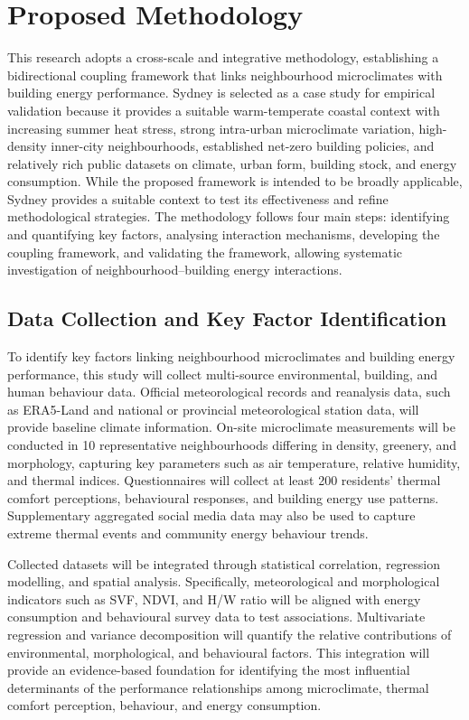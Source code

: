 \section{Proposed Methodology}

This research adopts a cross-scale and integrative methodology, establishing a bidirectional coupling framework that links neighbourhood microclimates with building energy performance. Sydney is selected as a case study for empirical validation because it provides a suitable warm-temperate coastal context with increasing summer heat stress, strong intra-urban microclimate variation, high-density inner-city neighbourhoods, established net-zero building policies, and relatively rich public datasets on climate, urban form, building stock, and energy consumption. While the proposed framework is intended to be broadly applicable, Sydney provides a suitable context to test its effectiveness and refine methodological strategies. The methodology follows four main steps: identifying and quantifying key factors, analysing interaction mechanisms, developing the coupling framework, and validating the framework, allowing systematic investigation of neighbourhood--building energy interactions.

\subsection{Data Collection and Key Factor Identification}

To identify key factors linking neighbourhood microclimates and building energy performance, this study will collect multi-source environmental, building, and human behaviour data. Official meteorological records and reanalysis data, such as ERA5-Land and national or provincial meteorological station data, will provide baseline climate information. On-site microclimate measurements will be conducted in 10 representative neighbourhoods differing in density, greenery, and morphology, capturing key parameters such as air temperature, relative humidity, and thermal indices. Questionnaires will collect at least 200 residents' thermal comfort perceptions, behavioural responses, and building energy use patterns. Supplementary aggregated social media data may also be used to capture extreme thermal events and community energy behaviour trends.

Collected datasets will be integrated through statistical correlation, regression modelling, and spatial analysis. Specifically, meteorological and morphological indicators such as SVF, NDVI, and H/W ratio will be aligned with energy consumption and behavioural survey data to test associations. Multivariate regression and variance decomposition will quantify the relative contributions of environmental, morphological, and behavioural factors. This integration will provide an evidence-based foundation for identifying the most influential determinants of the performance relationships among microclimate, thermal comfort perception, behaviour, and energy consumption.

